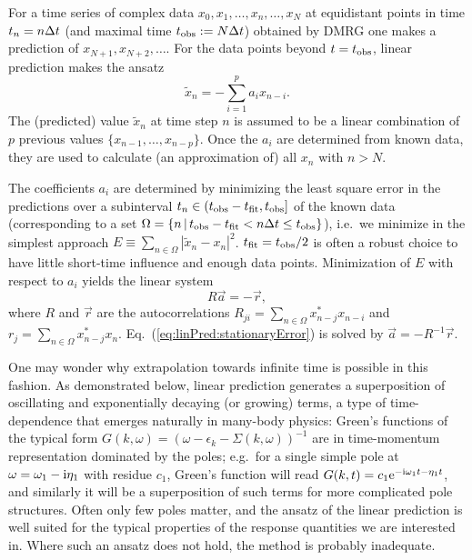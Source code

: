 \documentclass[a4paper,10pt,oneside,onecolumn,1p,times]{elsarticle}
\newcommand{\eul}{{\rm e }}
\newcommand{\imag}{{\rm i }}
\newcommand{\obs}{{\rm obs}}
\newcommand{\fit}{{\rm fit}}
\begin{document}
For a time series of complex data $x_0, x_1, \ldots, x_n, \ldots, x_N$ at equidistant points in time $t_n=n\*\Delta t$ (and maximal time $t_\obs:= N \Delta t$) obtained by DMRG one makes a prediction of $x_{N+1}, x_{N+2}, \ldots$. 
For the data points beyond $t=t_\obs$, linear prediction makes the ansatz
\begin{equation}\label{eq:predictionAnsatz}
\tilde{x}_n = - \sum_{i=1}^p a_i x_{n-i} .
\end{equation}
The (predicted) value $\tilde{x}_n$ at time step $n$ is assumed to be a linear combination of $p$ previous values $\{x_{n-1},\dots,x_{n-p}\}$. Once the $a_i$ are determined from known data, they are used to calculate (an approximation of) all $x_n$ with $n>N$.

The coefficients $a_i$ are determined by minimizing the least square error in the predictions over a subinterval $t_n \in (t_\obs-t_\fit,t_\obs]$ of the known data (corresponding to a set $\Omega = \{ n\, |\, t_\obs - t_\fit < n\Delta t \leq t_\obs \}$), i.e.\ we minimize in the simplest approach $E\equiv\sum_{n\in\Omega} |\tilde x_n-x_n|^2$. $t_\fit=t_\obs/2$ is often a robust choice to have little short-time influence and enough data points. Minimization of $E$ with respect to $a_i$ yields the linear system
\begin{equation}
\label{eq:linPred:stationaryError}
R \vec{a} = -\vec{r},
\end{equation}
where $R$ and $\vec{r}$ are the autocorrelations 
$R_{ji} = \sum_{n\in\Omega} x^*_{n-j} x_{n-i}$ and $r_{j} = \sum_{n\in\Omega} x^*_{n-j} x_n$.
Eq.~(\ref{eq:linPred:stationaryError}) is solved by $\vec{a}=-R^{-1}\vec{r}$.

One may wonder why extrapolation towards infinite time is possible in this fashion. 
As demonstrated below, linear prediction generates a superposition of oscillating and exponentially decaying (or growing) terms, a type of time-dependence that emerges naturally in many-body physics:
Green's functions of the typical form $G(k,\omega) = (\omega - \epsilon_k - \Sigma(k,\omega))^{-1}$ are in time-momentum representation dominated by the poles; e.g.\ for a single simple pole at $\omega=\omega_1 -\imag \eta_1$ with residue $c_1$, Green's function will read
$G(k,t) = c_1 \eul^{-\imag \omega_1 t - \eta_1 t}$, and similarly it will be a superposition of such terms for more complicated pole structures. Often only few poles matter, and the ansatz of the linear prediction is well suited for the typical properties of the response quantities we are interested in. Where such an ansatz does not hold, the method is probably inadequate.
\end{document}
